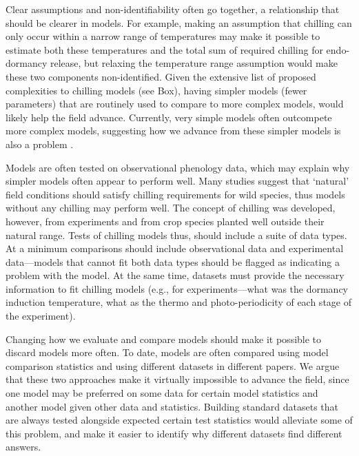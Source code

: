 \documentclass[11pt]{article}
\begin{document}
Clear assumptions and non-identifiability often go together, a relationship that should be clearer in models. For example, making an assumption that chilling can only occur within a narrow range of temperatures may make it possible to estimate both these temperatures and the total sum of required chilling for endo-dormancy release, but relaxing the temperature range assumption would make these two components non-identified. Given the extensive list of proposed complexities to chilling models (see Box), having simpler models (fewer parameters) that are routinely used to compare to more complex models, would likely help the field advance. Currently, very simple models often outcompete more complex models, suggesting how we advance from these simpler models is also a problem \citep[e.g.,][]{basler2016evaluating}. 

Models are often tested on observational phenology data, which may explain why simpler models often appear to perform well. Many studies suggest that `natural' field conditions should satisfy chilling requirements for wild species, thus models without any chilling may perform well. The concept of chilling was developed, however, from experiments and from crop species planted well outside their natural range. Tests of chilling models thus, should include a suite of data types. At a minimum comparisons should include observational data and experimental data---models that cannot fit both data types should be flagged as indicating a problem with the model.  At the same time, datasets must provide the necessary information to fit chilling models (e.g., for experiments---what was the dormancy induction temperature, what as the thermo and photo-periodicity of each stage of the experiment). 

Changing how we evaluate and compare models should make it possible to discard models more often. To date, models are often compared using model comparison statistics and using different datasets in different papers. We argue that these two approaches make it virtually impossible to advance the field, since one model may be preferred on some data for certain model statistics and another model given other data and statistics. Building standard datasets that are always tested alongside expected certain test statistics would alleviate some of this problem, and make it easier to identify why different datasets find different answers. 
\end{document}
